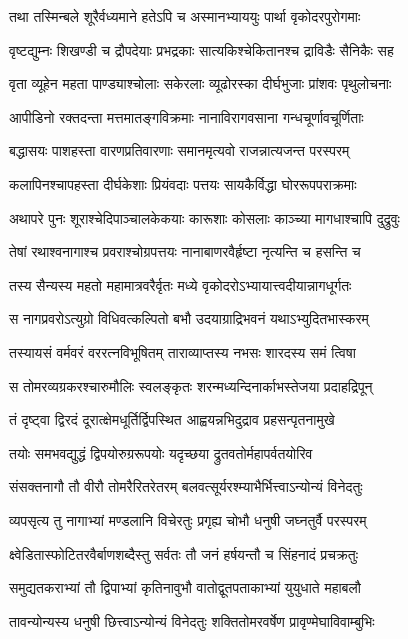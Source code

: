 \twolineshloka
{तथा तस्मिन्बले शूरैर्वध्यमाने हतेऽपि च}
{अस्मानभ्याययुः पार्था वृकोदरपुरोगमाः}


\twolineshloka
{वृष्टद्युम्नः शिखण्डी च द्रौपदेयाः प्रभद्रकाः}
{सात्यकिश्चेकितानश्च द्राविडैः सैनिकैः सह}


\twolineshloka
{वृता व्यूहेन महता पाण्ड्याश्चोलाः सकेरलाः}
{व्यूढोरस्का दीर्घभुजाः प्रांशवः पृथुलोचनाः}


\twolineshloka
{आपीडिनो रक्तदन्ता मत्तमातङ्गविक्रमाः}
{नानाविरागवसाना गन्धचूर्णावचूर्णिताः}


\twolineshloka
{बद्धासयः पाशहस्ता वारणप्रतिवारणाः}
{समानमृत्यवो राजन्नात्यजन्त परस्परम्}


\twolineshloka
{कलापिनश्चापहस्ता दीर्घकेशाः प्रियंवदाः}
{पत्तयः सायकैर्विद्धा घोररूपपराक्रमाः}


\twolineshloka
{अथापरे पुनः शूराश्चेदिपाञ्चालकेकयाः}
{कारूशाः कोसलाः काञ्च्या मागधाश्चापि दुद्रुवुः}


\twolineshloka
{तेषां रथाश्वनागाश्च प्रवराश्चोग्रपत्तयः}
{नानाबाणरवैर्हृष्टा नृत्यन्ति च हसन्ति च}


\twolineshloka
{तस्य सैन्यस्य महतो महामात्रवरैर्वृतः}
{मध्ये वृकोदरोऽभ्यायात्त्वदीयान्नागधूर्गतः}


\twolineshloka
{स नागप्रवरोऽत्युग्रो विधिवत्कल्पितो बभौ}
{उदयाग्राद्रिभवनं यथाऽभ्युदितभास्करम्}


\twolineshloka
{तस्यायसं वर्मवरं वररत्नविभूषितम्}
{ताराव्याप्तस्य नभसः शारदस्य समं त्विषा}


\twolineshloka
{स तोमरव्यग्रकरश्चारुमौलिः स्वलङ्कृतः}
{शरन्मध्यन्दिनार्काभस्तेजया प्रदाहद्रिपून्}


\twolineshloka
{तं दृष्ट्वा द्विरदं दूरात्क्षेमधूर्तिर्द्विपस्थित}
{आह्वयन्नभिदुद्राव प्रहसन्पृतनामुखे}


\twolineshloka
{तयोः समभवद्युद्धं द्विपयोरुग्ररूपयोः}
{यदृच्छया द्रुतवतोर्महापर्वतयोरिव}


\twolineshloka
{संसक्तनागौ तौ वीरौ तोमरैरितरेतरम्}
{बलवत्सूर्यरश्म्याभैर्भित्त्वाऽन्योन्यं विनेदतुः}


\twolineshloka
{व्यपसृत्य तु नागाभ्यां मण्डलानि विचेरतुः}
{प्रगृह्य चोभौ धनुषी जघ्नतुर्वै परस्परम्}


\twolineshloka
{क्ष्वेडितास्फोटितरवैर्बाणशब्दैस्तु सर्वतः}
{तौ जनं हर्षयन्तौ च सिंहनादं प्रचक्रतुः}


\twolineshloka
{समुद्यतकराभ्यां तौ द्विपाभ्यां कृतिनावुभौ}
{वातोद्वूतपताकाभ्यां युयुधाते महाबलौ}


\twolineshloka
{तावन्योन्यस्य धनुषी छित्त्वाऽन्योन्यं विनेदतुः}
{शक्तितोमरवर्षेण प्रावृण्मेघाविवाम्बुभिः}


